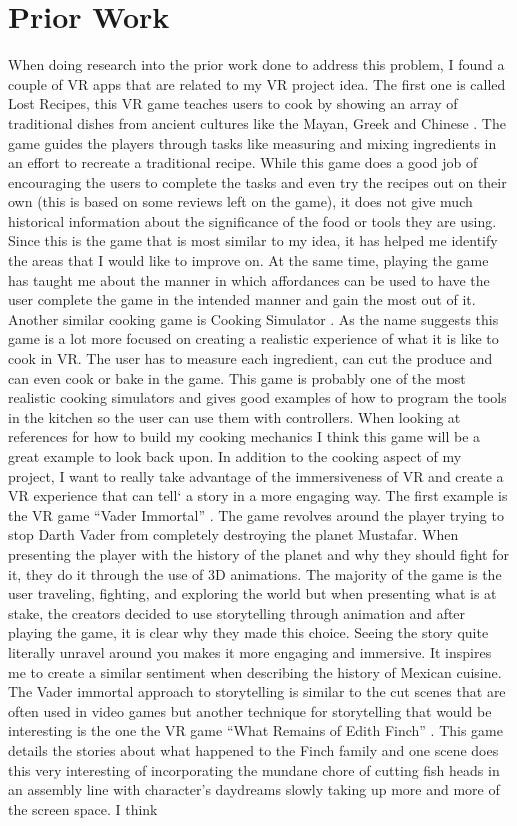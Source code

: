 \documentclass[10pt,twocolumn]{article}
\begin{document}
\section{Prior Work}
When doing research into the prior work done to address this problem, I found a couple of VR apps that are related to my VR project idea. The first one is called Lost Recipes, this VR game teaches users to cook by showing an array of traditional dishes from ancient cultures like the Mayan, Greek and Chinese \cite{lostrecipes2022}. The game guides the players through tasks like measuring and mixing ingredients in an effort to recreate a traditional recipe. While this game does a good job of encouraging the users to complete the tasks and even try the recipes out on their own (this is based on some reviews left on the game), it does not give much historical information about the significance of the food or tools they are using. Since this is the game that is most similar to my idea, it has helped me identify the areas that I would like to improve on. At the same time, playing the game has taught me about the manner in which affordances can be used to have the user complete the game in the intended manner and gain the most out of it. Another similar cooking game is Cooking Simulator \cite{cookingsim2019}. As the name suggests this game is a lot more focused on creating a realistic experience of what it is like to cook in VR. The user has to measure each ingredient, can cut the produce and can even cook or bake in the game. This game is probably one of the most realistic cooking simulators and gives good examples of how to program the tools in the kitchen so the user can use them with controllers. When looking at references for how to build my cooking mechanics I think this game will be a great example to look back upon. In addition to the cooking aspect of my project, I want to really take advantage of the immersiveness of VR and create a VR experience that can tell` a story in a more engaging way. The first example is the VR game “Vader Immortal” \cite{vadarimmortal2019ep1}. The game revolves around the player trying to stop Darth Vader from completely destroying the planet Mustafar. When presenting the player with the history of the planet and why they should fight for it, they do it through the use of 3D animations. The majority of the game is the user traveling, fighting, and exploring the world but when presenting what is at stake, the creators decided to use storytelling through animation and after playing the game, it is clear why they made this choice. Seeing the story quite literally unravel around you makes it more engaging and immersive. It inspires me to create a similar sentiment when describing the history of Mexican cuisine. The Vader immortal approach to storytelling is similar to the cut scenes that are often used in video games but another technique for storytelling that would be interesting is the one the VR game “What Remains of Edith Finch” \cite{finch2019}. This game details the stories about what happened to the Finch family and one scene does this very interesting of incorporating the mundane chore of cutting fish heads in an assembly line with character’s daydreams slowly taking up more and more of the screen space. I think 
\end{document}

